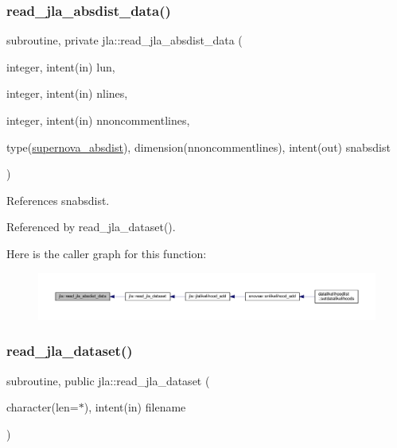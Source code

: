 \subsubsection{\texorpdfstring{read\+\_\+jla\+\_\+absdist\+\_\+data()}{read\_jla\_absdist\_data()}}
{\footnotesize\ttfamily subroutine, private jla\+::read\+\_\+jla\+\_\+absdist\+\_\+data (\begin{DoxyParamCaption}\item[{integer, intent(in)}]{lun,  }\item[{integer, intent(in)}]{nlines,  }\item[{integer, intent(in)}]{nnoncommentlines,  }\item[{type(\mbox{\hyperlink{structjla_1_1supernova__absdist}{supernova\+\_\+absdist}}), dimension(nnoncommentlines), intent(out)}]{snabsdist }\end{DoxyParamCaption})\hspace{0.3cm}{\ttfamily [private]}}



References snabsdist.



Referenced by read\+\_\+jla\+\_\+dataset().

Here is the caller graph for this function\+:
\nopagebreak
\begin{figure}[H]
\begin{center}
\leavevmode
\includegraphics[width=350pt]{namespacejla_ad1ad5e96f9f9f225249edadd8b348012_icgraph}
\end{center}
\end{figure}
\mbox{\label{namespacejla_a3a08d66a30f511b1a63b006b9c1fac53}} 
\subsubsection{\texorpdfstring{read\+\_\+jla\+\_\+dataset()}{read\_jla\_dataset()}}
{\footnotesize\ttfamily subroutine, public jla\+::read\+\_\+jla\+\_\+dataset (\begin{DoxyParamCaption}\item[{character(len=$\ast$), intent(in)}]{filename }\end{DoxyParamCaption})}



